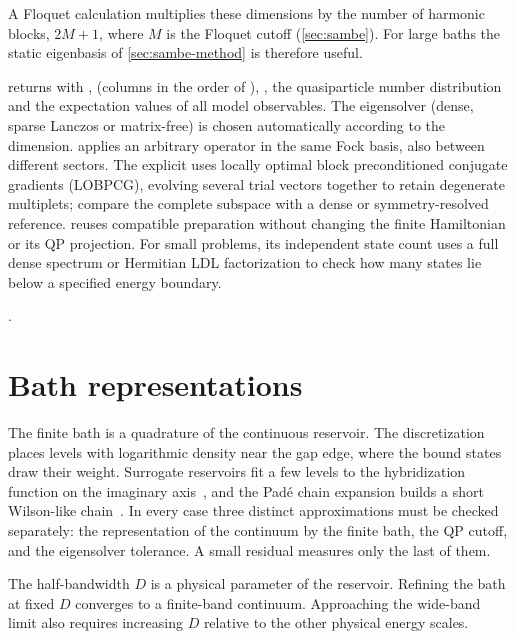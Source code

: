 A Floquet calculation multiplies these dimensions by the number of harmonic blocks, $2M+1$,
where $M$ is the Floquet cutoff (\cref{sec:sambe}). For large baths the static eigenbasis of
\cref{sec:sambe-method} is therefore useful.

\begin{incode}
 returns  with ,
 (columns in the order of ), , the quasiparticle
number distribution  and the expectation values of all model
observables. The eigensolver (dense, sparse Lanczos or matrix-free) is chosen automatically
according to the dimension.  applies an arbitrary operator
in the same Fock basis, also between different sectors.
The explicit  uses locally optimal block preconditioned
conjugate gradients (LOBPCG), evolving several trial vectors together
to retain degenerate multiplets; compare the complete subspace with a dense or
symmetry-resolved reference.  reuses compatible preparation
without changing the finite Hamiltonian or its QP projection. For small problems,
its independent state count uses a full dense spectrum or Hermitian LDL factorization
to check how many states lie below a specified energy boundary.
\par\smallskip{}.
\end{incode}

\section{Bath representations}\label{sec:bath}

The finite bath is a quadrature of the continuous reservoir. The 
discretization places levels with logarithmic density near the gap edge, where the bound
states draw their weight. Surrogate reservoirs fit a few levels to the hybridization
function on the imaginary axis~\cite{baran2023surrogate}, and the Pad\'e chain expansion
builds a short Wilson-like chain~\cite{bobok2025scalable}. In every case three distinct
approximations must be checked separately: the representation of the continuum by the
finite bath, the QP cutoff, and the eigensolver tolerance. A small residual measures only
the last of them.

\begin{caution}
The half-bandwidth $D$ is a physical parameter of the reservoir. Refining the bath at
fixed $D$ converges to a finite-band continuum. Approaching the wide-band limit
also requires increasing $D$ relative to the other physical energy scales.
\end{caution}

